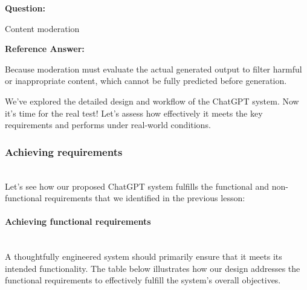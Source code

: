 \textbf{Question:}

Content moderation

\textbf{Reference Answer:}

Because moderation must evaluate the actual generated output to filter harmful or inappropriate content, which cannot be fully predicted before generation.

We've explored the detailed design and workflow of the ChatGPT system. Now it's time for the real test! Let's assess how effectively it meets the key requirements and performs under real-world conditions.

\subsubsection{Achieving requirements}\label{Gjuj806_wvZfCyRWOlPRC}
\\
Let's see how our proposed ChatGPT system fulfills the functional and non-functional requirements that we identified in the previous lesson:
\\
\paragraph{Achieving functional requirements}\label{_OKbOlzbzHj-034A8PC2U}
\\
A thoughtfully engineered system should primarily ensure that it meets its intended functionality. The table below illustrates how our design addresses the functional requirements to effectively fulfill the system's overall objectives.


